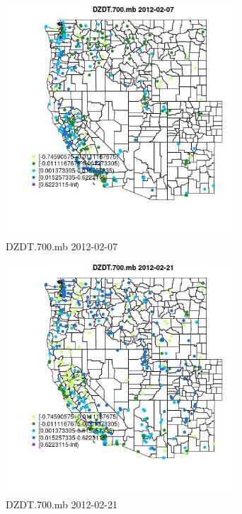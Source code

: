 \begin{figure} 
\centering  
\includegraphics[width=0.77\textwidth]{Code_Outputs/Report_ML_input_PM25_Step4_part_f_de_duplicated_aves_prioritize_24hr_obswNAs_MapObsDZDT700mb2012-02-07.jpg} 
\caption{\label{fig:Report_ML_input_PM25_Step4_part_f_de_duplicated_aves_prioritize_24hr_obswNAsMapObsDZDT700mb2012-02-07}DZDT.700.mb 2012-02-07} 
\end{figure} 
 

\begin{figure} 
\centering  
\includegraphics[width=0.77\textwidth]{Code_Outputs/Report_ML_input_PM25_Step4_part_f_de_duplicated_aves_prioritize_24hr_obswNAs_MapObsDZDT700mb2012-02-21.jpg} 
\caption{\label{fig:Report_ML_input_PM25_Step4_part_f_de_duplicated_aves_prioritize_24hr_obswNAsMapObsDZDT700mb2012-02-21}DZDT.700.mb 2012-02-21} 
\end{figure} 
 

